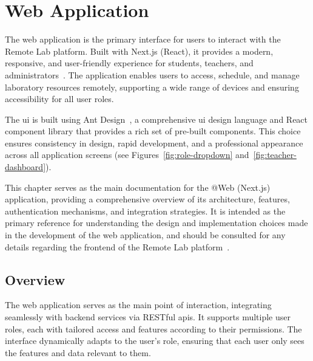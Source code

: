\chapter{Web Application} \label{cap:web_app}

The web application is the primary interface for users to interact with the Remote Lab platform. Built with Next.js (React), it provides a modern, responsive, and user-friendly experience for students, teachers, and administrators~\cite{nextjs-docs}. The application enables users to access, schedule, and manage laboratory resources remotely, supporting a wide range of devices and ensuring accessibility for all user roles.

The \acf{ui} is built using Ant Design~\cite{antdesign}, a comprehensive \ac{ui} design language and React component library that provides a rich set of pre-built components. This choice ensures consistency in design, rapid development, and a professional appearance across all application screens (see Figures~\ref{fig:role-dropdown} and~\ref{fig:teacher-dashboard}).

This chapter serves as the main documentation for the @Web (Next.js) application, providing a comprehensive overview of its architecture, features, authentication mechanisms, and integration strategies. It is intended as the primary reference for understanding the design and implementation choices made in the development of the web application, and should be consulted for any details regarding the frontend of the Remote Lab platform~\cite{nextjs-docs}.

\section{Overview}
The web application serves as the main point of interaction, integrating seamlessly with backend services via RESTful \ac{api}s. It supports multiple user roles, each with tailored access and features according to their permissions. The interface dynamically adapts to the user's role, ensuring that each user only sees the features and data relevant to them.


